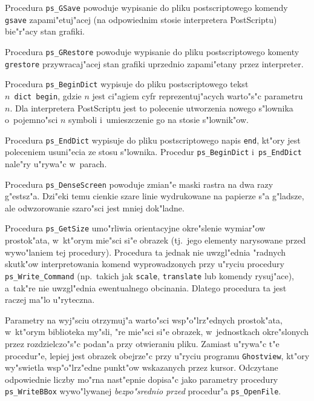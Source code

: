 \vspace{\bigskipamount}
Procedura \texttt{ps\_GSave} powoduje wypisanie do pliku postscriptowego
komendy \texttt{gsave} zapami"etuj"acej (na odpowiednim stosie interpretera
PostScriptu) bie"r"acy stan grafiki.

Procedura \texttt{ps\_GRestore} powoduje wypisanie do pliku postscriptowego
komenty \texttt{grestore} przywracaj"acej stan grafiki uprzednio zapami"etany
przez interpreter.

\vspace{\bigskipamount}
Procedura \texttt{ps\_BeginDict} wypisuje do pliku postscriptowego tekst \\
\texttt{$n$ dict begin}, gdzie $n$ jest ci"agiem cyfr reprezentuj"acych
warto"s"c parametru~$n$. Dla interpretera PostScriptu jest to polecenie
utworzenia nowego s"lownika o~pojemno"sci $n$ symboli i~umieszczenie go na
stosie s"lownik"ow.

Procedura \texttt{ps\_EndDict} wypisuje do pliku postscriptowego napis
\texttt{end}, kt"ory jest poleceniem usuni"ecia ze stosu s"lownika. Procedur
\texttt{ps\_BeginDict} i~\texttt{ps\_EndDict} nale"ry u"rywa"c w~parach.

\newpage
Procedura \texttt{ps\_DenseScreen} powoduje zmian"e maski rastra na dwa razy
g"estsz"a. Dzi"eki temu cienkie szare linie wydrukowane na papierze s"a
g"ladsze, ale odwzorowanie szaro"sci jest mniej dok"ladne.

\vspace{\bigskipamount}
Procedura \texttt{ps\_GetSize} umo"rliwia orientacyjne okre"slenie wymiar"ow
prostok"ata, w~kt"orym mie"sci si"e obrazek (tj.\ jego elementy narysowane
przed wywo"laniem tej procedury). Procedura ta jednak nie
uwzgl"ednia "radnych skutk"ow interpretowania komend wyprowadzonych przy
u"ryciu procedury \texttt{ps\_Write\_Command} (np.\ takich jak
\texttt{scale}, \texttt{translate} lub komendy rysuj"ace), a~tak"re nie
uwzgl"ednia ewentualnego obcinania. Dlatego procedura ta jest raczej ma"lo
u"ryteczna.

Parametry na wyj"sciu otrzymuj"a warto"sci wsp"o"lrz"ednych prostok"ata,
w~kt"orym biblioteka my"sli, "re mie"sci si"e obrazek, w~jednostkach
okre"slonych przez rozdzielczo"s"c podan"a przy otwieraniu pliku. Zamiast
u"rywa"c t"e procedur"e, lepiej jest obrazek obejrze"c przy u"ryciu programu
\texttt{Ghostview}, kt"ory wy"swietla wsp"o"lrz"edne punkt"ow wskazanych
przez kursor. Odczytane odpowiednie liczby mo"rna nast"epnie dopisa"c jako
parametry procedury \texttt{ps\_WriteBBox} wywo"lywanej \emph{bezpo"srednio
przed} procedur"a \texttt{ps\_OpenFile}.


